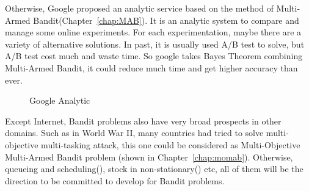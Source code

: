 Otherwise, Google proposed an analytic service based on the method of Multi-Armed Bandit(Chapter~\ref{chap:MAB}). It is an analytic system to compare and manage some online experiments. For each experimentation, maybe there are a variety of alternative solutions. In past, it is usually used A/B test to solve, but A/B test cost much and waste time. So google takes Bayes Theorem combining Multi-Armed Bandit, it could reduce much time and get higher accuracy than ever.
\begin{figure}[!h]
\caption{Google Analytic}
\end{figure}

Except Internet, Bandit problems also have very broad prospects in other domains. Such as in World War II, many countries had tried to solve multi-objective multi-tasking attack, this one could be considered as Multi-Objective Multi-Armed Bandit problem (shown in Chapter~\ref{chap:momab}). Otherwise, queueing and scheduling(\cite{veatch1996scheduling,ehsan2004optimality}), stock in non-stationary(\cite{garivier2008upper}) etc, all of them will be the direction to be committed to develop for Bandit problems.
